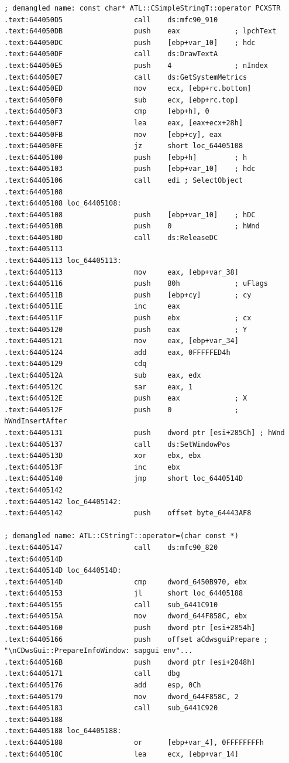 \begin{lstlisting}
; demangled name: const char* ATL::CSimpleStringT::operator PCXSTR 
.text:644050D5                 call    ds:mfc90_910
.text:644050DB                 push    eax             ; lpchText
.text:644050DC                 push    [ebp+var_10]    ; hdc
.text:644050DF                 call    ds:DrawTextA
.text:644050E5                 push    4               ; nIndex
.text:644050E7                 call    ds:GetSystemMetrics
.text:644050ED                 mov     ecx, [ebp+rc.bottom]
.text:644050F0                 sub     ecx, [ebp+rc.top]
.text:644050F3                 cmp     [ebp+h], 0
.text:644050F7                 lea     eax, [eax+ecx+28h]
.text:644050FB                 mov     [ebp+cy], eax
.text:644050FE                 jz      short loc_64405108
.text:64405100                 push    [ebp+h]         ; h
.text:64405103                 push    [ebp+var_10]    ; hdc
.text:64405106                 call    edi ; SelectObject
.text:64405108
.text:64405108 loc_64405108:
.text:64405108                 push    [ebp+var_10]    ; hDC
.text:6440510B                 push    0               ; hWnd
.text:6440510D                 call    ds:ReleaseDC
.text:64405113
.text:64405113 loc_64405113:
.text:64405113                 mov     eax, [ebp+var_38]
.text:64405116                 push    80h             ; uFlags
.text:6440511B                 push    [ebp+cy]        ; cy
.text:6440511E                 inc     eax
.text:6440511F                 push    ebx             ; cx
.text:64405120                 push    eax             ; Y
.text:64405121                 mov     eax, [ebp+var_34]
.text:64405124                 add     eax, 0FFFFFED4h
.text:64405129                 cdq
.text:6440512A                 sub     eax, edx
.text:6440512C                 sar     eax, 1
.text:6440512E                 push    eax             ; X
.text:6440512F                 push    0               ; hWndInsertAfter
.text:64405131                 push    dword ptr [esi+285Ch] ; hWnd
.text:64405137                 call    ds:SetWindowPos
.text:6440513D                 xor     ebx, ebx
.text:6440513F                 inc     ebx
.text:64405140                 jmp     short loc_6440514D
.text:64405142
.text:64405142 loc_64405142:
.text:64405142                 push    offset byte_64443AF8

; demangled name: ATL::CStringT::operator=(char const *)
.text:64405147                 call    ds:mfc90_820
.text:6440514D
.text:6440514D loc_6440514D:
.text:6440514D                 cmp     dword_6450B970, ebx
.text:64405153                 jl      short loc_64405188
.text:64405155                 call    sub_6441C910
.text:6440515A                 mov     dword_644F858C, ebx
.text:64405160                 push    dword ptr [esi+2854h]
.text:64405166                 push    offset aCdwsguiPrepare ; "\nCDwsGui::PrepareInfoWindow: sapgui env"...
.text:6440516B                 push    dword ptr [esi+2848h]
.text:64405171                 call    dbg
.text:64405176                 add     esp, 0Ch
.text:64405179                 mov     dword_644F858C, 2
.text:64405183                 call    sub_6441C920
.text:64405188
.text:64405188 loc_64405188:
.text:64405188                 or      [ebp+var_4], 0FFFFFFFFh
.text:6440518C                 lea     ecx, [ebp+var_14]


\end{lstlisting}
